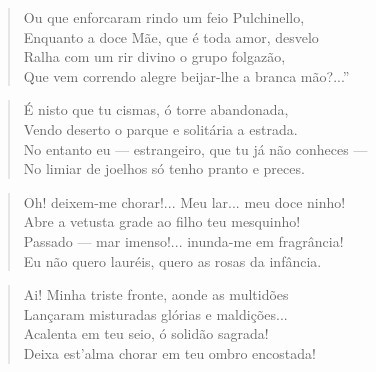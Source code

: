 \begin{anexosenv}
\begin{verse}
Ou que enforcaram rindo um feio Pulchinello, \\
Enquanto a doce Mãe, que é toda amor, desvelo \\
Ralha com um rir divino o grupo folgazão, \\
Que vem correndo alegre beijar-lhe a branca mão?...'' \\
\end{verse}

\begin{verse}
É nisto que tu cismas, ó torre abandonada, \\
Vendo deserto o parque e solitária a estrada. \\
No entanto eu — estrangeiro, que tu já não conheces — \\
No limiar de joelhos só tenho pranto e preces. \\
\end{verse}

\begin{verse}
Oh! deixem-me chorar!... Meu lar... meu doce ninho! \\
Abre a vetusta grade ao filho teu mesquinho! \\
Passado — mar imenso!... inunda-me em fragrância! \\
Eu não quero lauréis, quero as rosas da infância. \\
\end{verse}

\begin{verse}
Ai! Minha triste fronte, aonde as multidões \\
Lançaram misturadas glórias e maldições... \\
Acalenta em teu seio, ó solidão sagrada! \\
Deixa est'alma chorar em teu ombro encostada! \\
\end{verse}


\end{anexosenv}
